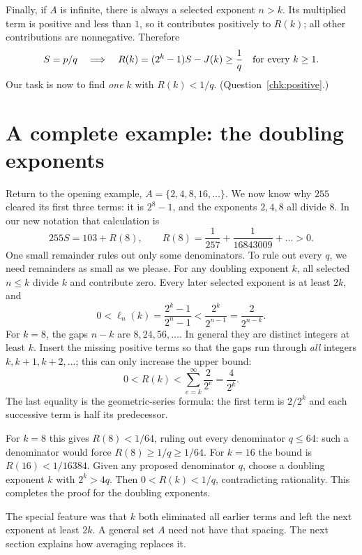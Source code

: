 \documentclass[10pt]{article}
\theoremstyle{plain}
\theoremstyle{definition}
\theoremstyle{remark}
\newcommand{\lft}{\ell}
\begin{document}
Finally, if $A$ is infinite, there is always a selected exponent $n>k$.
Its multiplied term is positive and less than $1$, so it contributes
positively to $R(k)$; all other contributions are nonnegative. Therefore
\[
 S=p/q\quad\Longrightarrow\quad
 R(k)=(2^k-1)S-J(k)\ge\frac1q\quad\hbox{for every }k\ge1.
\]
Our task is now to find \emph{one} $k$ with $R(k)<1/q$.
(Question~\ref{chk:positive}.)

\section{A complete example: the doubling exponents}\label{sec:doubling}

Return to the opening example, $A=\{2,4,8,16,\dots\}$.
We now know why $255$ cleared its first three terms: it is $2^8-1$,
and the exponents $2,4,8$ all divide $8$. In our new notation that calculation is
\[
 255S=103+R(8),\qquad R(8)=\frac1{257}+\frac1{16843009}+\dots>0.
\]
One small remainder rules out only some denominators. To rule out every
$q$, we need remainders as small as we please. For any doubling exponent
$k$, all selected $n\le k$ divide $k$ and contribute zero. Every later
selected exponent is at least $2k$, and
\[
 0<\lft_n(k)=\frac{2^k-1}{2^n-1}
 <\frac{2^k}{2^{n-1}}=\frac2{2^{n-k}}.
\]
For $k=8$, the gaps $n-k$ are $8,24,56,\dots$. In general they are
distinct integers at least $k$. Insert the missing positive terms so that
the gaps run through \emph{all} integers $k,k+1,k+2,\dots$; this can only
increase the upper bound:
\[
 0<R(k)<\sum_{e=k}^{\infty}\frac2{2^e}=\frac4{2^k}.
\]
The last equality is the geometric-series formula: the first term is
$2/2^k$ and each successive term is half its predecessor.

\begin{samepage}
For $k=8$ this
gives $R(8)<1/64$, ruling out every denominator $q\le64$: such a
denominator would force $R(8)\ge1/q\ge1/64$.
For $k=16$ the bound is $R(16)<1/16384$.
Given any proposed denominator $q$, choose a doubling exponent $k$ with
$2^k>4q$. Then $0<R(k)<1/q$, contradicting rationality. This completes
the proof for the doubling exponents.\par
\end{samepage}

The special feature was that $k$ both eliminated all earlier terms and
left the next exponent at least $2k$. A general set $A$ need not have that
spacing. The next section explains how averaging replaces it.
\end{document}
